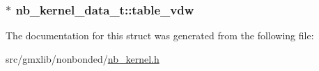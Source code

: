 \hypertarget{structnb__kernel__data__t_ab73c8647653de8e9ae8804982bcec0f9}{
\subsubsection[{table\-\_\-vdw}]{$\ast$ {\bf nb\-\_\-kernel\-\_\-data\-\_\-t\-::table\-\_\-vdw}}}\label{structnb__kernel__data__t_ab73c8647653de8e9ae8804982bcec0f9}


\-The documentation for this struct was generated from the following file\-:\begin{DoxyCompactItemize}
\item 
src/gmxlib/nonbonded/\hyperlink{nb__kernel_8h}{nb\-\_\-kernel.\-h}\end{DoxyCompactItemize}
